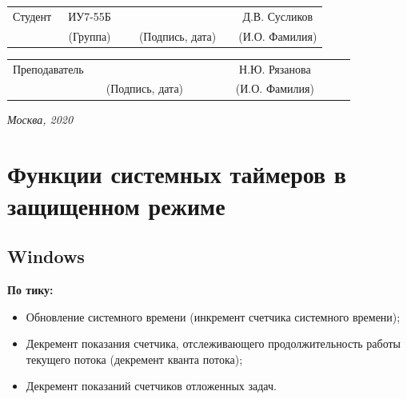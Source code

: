 \documentclass[14pt, a4paper]{extarticle}
\begin{document}
	
	\noindent
	\\
	\indent\indent{}
	
	\noindent
	\\
	
	\vspace{1.5cm}
	\noindent
	\begin{tabular}{l c c c c c}
		Студент      & ~ИУ7-55Б~               & \hspace{2.5cm} & \hspace{2cm}                 & &  Д.В. 
		Сусликов \\\cline{2-2}\cline{4-4} \cline{6-6} 
		\hspace{3cm} & {\footnotesize(Группа)} &                & {\footnotesize(Подпись, дата)} & & {\footnotesize(И.О. Фамилия)}
	\end{tabular}
	
	\noindent
	\begin{tabular}{l c c c c}
		Преподаватель & \hspace{5cm}   & \hspace{2cm}                 & & ~~~~~~Н.Ю. Рязанова~~~~~~\\\cline{3-3} \cline{5-5} 
		\hspace{3cm}  &                & {\footnotesize(Подпись, дата)} & & {\footnotesize(И.О. Фамилия)}
	\end{tabular}
	
	\vspace{0.6cm}
	\begin{center}	
		\vfill
		\large \textit {Москва, 2020}
	\end{center}
	
	\thispagestyle {empty}
	\pagebreak
	
	\clearpage
	\tableofcontents
	
	
	\clearpage
	\section{Функции системных таймеров в защищенном режиме}
	\subsection{Windows}
	\textbf{По тику:}
	\begin{itemize}
		\item[1)] Обновление системного времени (инкремент счетчика системного времени); 
		\item[2)] Декремент показания счетчика, отслеживающего продолжительность
		работы текущего потока (декремент кванта потока); 
		\item[3)] Декремент показаний счетчиков отложенных задач.
	\end{itemize}
	
\end{document}
